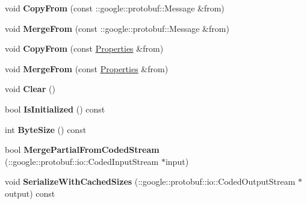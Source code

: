 \begin{DoxyCompactItemize}
\hypertarget{classstruct_definitions_1_1_properties_a465b10877f6141b6f094f2153a9bba64}{}\label{classstruct_definitions_1_1_properties_a465b10877f6141b6f094f2153a9bba64} 
void {\bfseries Copy\+From} (const \+::google\+::protobuf\+::\+Message \&from)
\item 
\hypertarget{classstruct_definitions_1_1_properties_a3f04053a7c573d8e8a9673ba168a16c2}{}\label{classstruct_definitions_1_1_properties_a3f04053a7c573d8e8a9673ba168a16c2} 
void {\bfseries Merge\+From} (const \+::google\+::protobuf\+::\+Message \&from)
\item 
\hypertarget{classstruct_definitions_1_1_properties_acbe95b87a855e5d54a0449075b622407}{}\label{classstruct_definitions_1_1_properties_acbe95b87a855e5d54a0449075b622407} 
void {\bfseries Copy\+From} (const \hyperlink{classstruct_definitions_1_1_properties}{Properties} \&from)
\item 
\hypertarget{classstruct_definitions_1_1_properties_a93b01b14393abfc3c95fd0d36b6f76b4}{}\label{classstruct_definitions_1_1_properties_a93b01b14393abfc3c95fd0d36b6f76b4} 
void {\bfseries Merge\+From} (const \hyperlink{classstruct_definitions_1_1_properties}{Properties} \&from)
\item 
\hypertarget{classstruct_definitions_1_1_properties_a55483e01ce13040221075d634e9f4d2d}{}\label{classstruct_definitions_1_1_properties_a55483e01ce13040221075d634e9f4d2d} 
void {\bfseries Clear} ()
\item 
\hypertarget{classstruct_definitions_1_1_properties_a8785c57991279ef210521d04abb29d94}{}\label{classstruct_definitions_1_1_properties_a8785c57991279ef210521d04abb29d94} 
bool {\bfseries Is\+Initialized} () const
\item 
\hypertarget{classstruct_definitions_1_1_properties_a272c27945f467cde3410a8c796ad53b2}{}\label{classstruct_definitions_1_1_properties_a272c27945f467cde3410a8c796ad53b2} 
int {\bfseries Byte\+Size} () const
\item 
\hypertarget{classstruct_definitions_1_1_properties_a1c1fe3e03b169a5a82f244a49f42571f}{}\label{classstruct_definitions_1_1_properties_a1c1fe3e03b169a5a82f244a49f42571f} 
bool {\bfseries Merge\+Partial\+From\+Coded\+Stream} (\+::google\+::protobuf\+::io\+::\+Coded\+Input\+Stream $\ast$input)
\item 
\hypertarget{classstruct_definitions_1_1_properties_ab3c7527e4f965d51a23502336e70f797}{}\label{classstruct_definitions_1_1_properties_ab3c7527e4f965d51a23502336e70f797} 
void {\bfseries Serialize\+With\+Cached\+Sizes} (\+::google\+::protobuf\+::io\+::\+Coded\+Output\+Stream $\ast$output) const

\end{DoxyCompactItemize}
